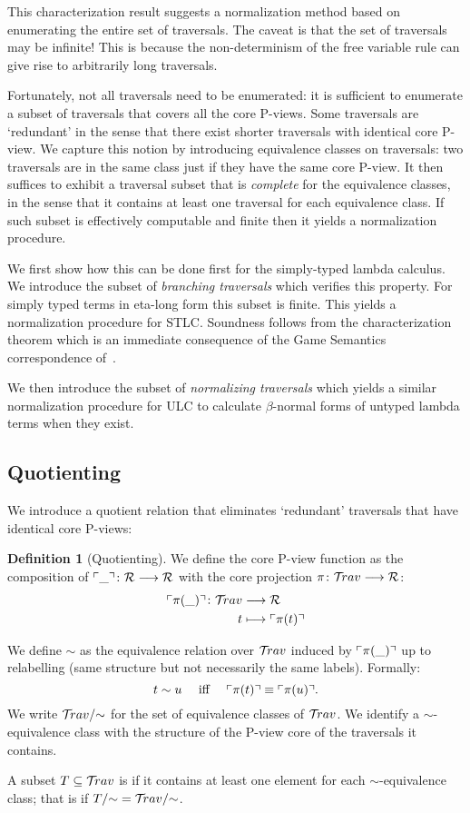 \documentclass{article}
\theoremstyle{definition}
\newtheorem{definition}{Definition}[section]
\newcommand{\travulc}{\travset}
\def\coresymbol{\pi} %
\newcommand{\core}[1]{\coresymbol(#1)} %
\def\relabjustseqset{\mathcal{R}}
\begin{document}
This characterization result suggests a normalization method based on enumerating the entire set of traversals. The caveat is that the set of traversals may be infinite! This is because the non-determinism of the free variable rule can give rise to arbitrarily long traversals.

Fortunately, not all traversals need to be enumerated: it is sufficient to enumerate a subset of traversals that covers all the core P-views. Some traversals are `redundant' in the sense that there exist shorter traversals with identical core P-view. We capture this notion by introducing equivalence classes on traversals: two traversals are in the same class just if they have the same core P-view. It then suffices to exhibit a traversal subset that is \emph{complete} for the equivalence classes, in the sense that it contains at least one traversal for each equivalence class. If such subset is effectively computable and finite then it yields a normalization procedure.

We first show how this can be done first for the simply-typed lambda calculus. We introduce the subset of \emph{branching traversals} which verifies this property. For simply typed terms in eta-long form this subset is finite. This yields a normalization procedure for STLC.
Soundness follows from the characterization theorem which is an immediate consequence of the Game Semantics correspondence of~\cite{BlumPhd}.

We then introduce the subset of \emph{normalizing traversals} which yields a similar normalization procedure for ULC to calculate $\beta$-normal forms of untyped lambda terms when they exist.

\subsection{Quotienting}

We introduce a quotient relation that eliminates `redundant' traversals that have identical core P-views:
\begin{definition}[Quotienting]
We define the core P-view function as the composition of $\pview{\_}\colon \relabjustseqset \longrightarrow \relabjustseqset$ with the core projection $\coresymbol\colon\travulc  \longrightarrow \relabjustseqset$:
\begin{align*}
\pview{\core{\_}} \colon \travulc & \longrightarrow \relabjustseqset \\
t & \longmapsto \pview{\core{t}}
\end{align*}

We define $\sim$ as the equivalence relation over $\travulc$ induced by $\pview{\core{\_}}$ up to relabelling (same structure but not necessarily the same labels). Formally:
$$t \sim u \quad \mbox{ iff } \quad  \pview{\core{t}} \equiv \pview{\core{u}} .$$
We write $\travulc/{\sim}$ for the set of equivalence classes of $\travulc$. We identify a $\sim$-equivalence class with the structure of the P-view core of the traversals it contains.

A subset $T\subseteq \travulc$ is  if it contains at least one element for each $\sim$-equivalence class; that is if $T/{\sim} = \travulc/{\sim}$.
\end{definition}
\end{document}

